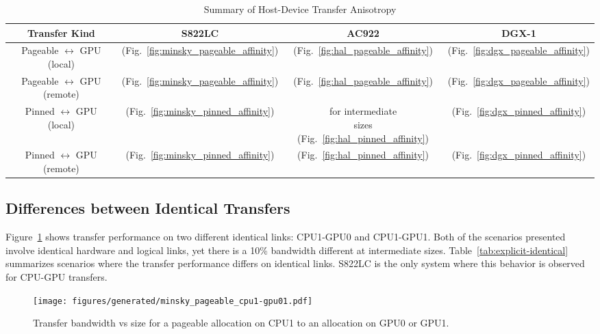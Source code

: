 \begin{table}[ht]
	\centering
	\caption[Summary of Host-Device Transfer Anisotropy]{Summary of Host-Device Transfer Anisotropy}
	\label{tab:explicit-anisotropy}
	\begin{tabular}{|c|c|c|c|}
		\hline
		\textbf{Transfer Kind}                  & \textbf{S822LC}                                      & \textbf{AC922}                                    & \textbf{DGX-1}                                    \\ \hline 
		Pageable $\leftrightarrow$ GPU (local)  & \checkmark (Fig.~\ref{fig:minsky_pageable_affinity}) & \checkmark (Fig.~\ref{fig:hal_pageable_affinity}) & \checkmark (Fig.~\ref{fig:dgx_pageable_affinity}) \\ \hline
		Pageable $\leftrightarrow$ GPU (remote) & \checkmark (Fig.~\ref{fig:minsky_pageable_affinity}) & \checkmark (Fig.~\ref{fig:hal_pageable_affinity}) & \checkmark (Fig.~\ref{fig:dgx_pageable_affinity}) \\ \hline
		Pinned $\leftrightarrow$ GPU (local)    & \checkmark (Fig.~\ref{fig:minsky_pinned_affinity})   & \makecell{for intermediate \\ sizes (Fig.~\ref{fig:hal_pinned_affinity}) } & \checkmark (Fig.~\ref{fig:dgx_pinned_affinity}) \\ \hline
		Pinned $\leftrightarrow$ GPU (remote)   & \checkmark (Fig.~\ref{fig:minsky_pinned_affinity})   & \checkmark (Fig.~\ref{fig:hal_pinned_affinity})   & \checkmark (Fig.~\ref{fig:dgx_pinned_affinity})   \\ \hline
	\end{tabular}
\end{table}

\subsection{Differences between Identical Transfers}
\label{sec:explicit-cpu-gpu-identical}

Figure~\ref{fig:minsky_pageable_cpu1-gpu01} shows transfer performance on two different identical links: CPU1-GPU0 and CPU1-GPU1.
Both of the scenarios presented involve identical hardware and logical links, yet there is a 10\% bandwidth different at intermediate sizes.
Table~\ref{tab:explicit-identical} summarizes scenarios where the transfer performance differs on identical links.
S822LC is the only system where this behavior is observed for CPU-GPU transfers.

\begin{figure}[ht]
	\centering
	\texttt{[image: figures/generated/minsky\_pageable\_cpu1-gpu01.pdf]}
	\caption[]{
		Transfer bandwidth vs size for a pageable allocation on CPU1 to an allocation on GPU0 or GPU1.
	}
	\label{fig:minsky_pageable_cpu1-gpu01}
\end{figure}

